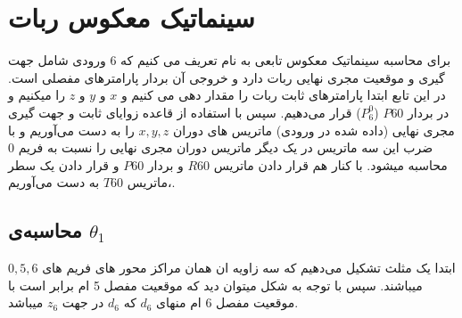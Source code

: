 \documentclass{article}
\begin{document}
\section{سینماتیک معکوس ربات}
برای محاسبه سینماتیک معکوس تابعی به نام  تعریف می کنیم که 6 ورودی شامل جهت گیری و موقعیت مجری نهایی ربات دارد و خروجی آن بردار پارامترهای مفصلی است.
در این تابع ابتدا پارامترهای ثابت ربات را مقدار دهی می کنیم و $x$ و $y$ و $z$ را  میکنیم و در بردار $P60$ ($P_6^0$) قرار می‌دهیم.
سپس با استفاده از قاعده زوایای ثابت و جهت گیری مجری نهایی (داده شده در ورودی) ماتریس های دوران $x,y,z$ را به دست می‌آوریم و با ضرب این سه ماتریس در یک دیگر ماتریس دوران مجری نهایی را نسبت به فریم $0$ محاسبه میشود.
با کنار هم قرار دادن ماتریس $R60$ و بردار $P60$ و قرار دادن یک سطر  ،ماتریس $T60$ به دست می‌آوریم.

\subsection{محاسبه‌ی $\theta_1$}
ابتدا یک مثلث تشکیل می‌دهیم که سه زاویه ان همان مراکز محور های فریم های $0,5,6$ میباشند. سپس با توجه به شکل میتوان دید که موقعیت مفصل 5 ام برابر است با موقعیت مفصل 6 ام منهای $d_6$ که $d_6$ در جهت $z_6$ میباشد.
\end{document}
